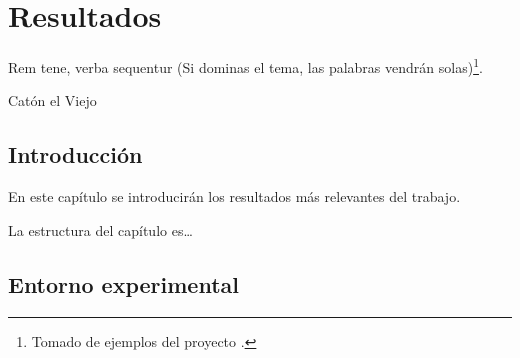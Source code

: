 %
%
%
% 
%
%
%
%

\chapter{Resultados}
\label{cha:resultados}


\begin{FraseCelebre}
  \begin{Frase}
    Rem tene, verba sequentur (Si dominas el tema, las palabras vendrán
    solas)\footnote{Tomado de ejemplos del proyecto \texis{}.}.
  \end{Frase}
  \begin{Fuente}
    Catón el Viejo
  \end{Fuente}
\end{FraseCelebre}

\section{Introducción}
\label{sec:introduccion-resultados}

En este capítulo se introducirán los resultados más relevantes del
trabajo. 

La estructura del capítulo es\ldots


\section{Entorno experimental}
\label{sec:entorno-experimental}


